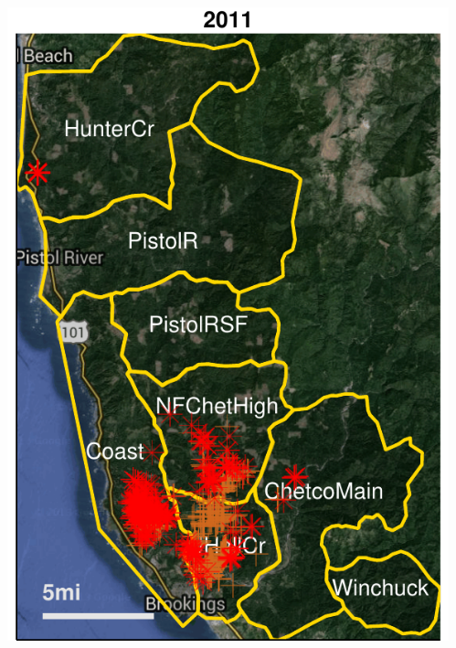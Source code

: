 \documentclass{beamer}\usepackage[]{graphicx}\usepackage[]{color}
\begin{document}
\begin{frame}[allowpagebreak,T]

	\begin{columns}[allowpagebreak,T]
		\begin{column}{0.5\paperwidth}
			\centering
			\includegraphics[keepaspectratio,width=0.48\paperwidth]{figure/2011-1.pdf}
		\end{column}
		\begin{column}{0.5\paperwidth}
			\centering
\end{column}
\end{columns}
\end{frame}
\end{document}
